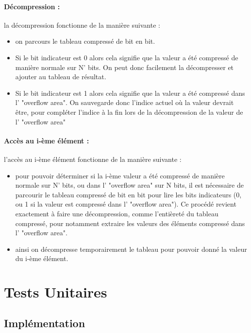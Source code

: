 \documentclass[titlepage]{article}
\begin{document}
\paragraph{Décompression :} la décompression fonctionne de la manière suivante :
\begin{itemize}
\item on parcours le tableau compressé de bit en bit.
\item Si le bit indicateur est 0 alors cela signifie que la valeur a été compressé de manière normale sur N' bits. On peut donc facilement la décompresser et ajouter au tableau de résultat.
\item Si le bit indicateur est 1 alors cela signifie que la valeur a été compressé dans l' "overflow area". On sauvegarde donc l'indice actuel où la valeur devrait être, pour compléter l'indice à la fin lors de la décompression de la valeur de l' "overflow area"
\end{itemize}

\paragraph{Accès au i-ème élément :} l'accès au i-ème élément fonctionne de la manière suivante :
\begin{itemize}
\item pour pouvoir déterminer si la i-ème valeur a été compressé de manière normale sur N' bits, ou dans l' "overflow area" sur N bits, il est nécessaire de parcourir le tableau compressé de bit en bit pour lire les bits indicateurs (0, ou 1 si la valeur est compressé dans l' "overflow area"). Ce procédé revient exactement à faire une décompression, comme l'entièreté du tableau compressé, pour notamment extraire les valeurs des éléments compressé dans l' "overflow area".
\item ainsi on décompresse temporairement le tableau pour pouvoir donné la valeur du i-ème élément.
\end{itemize}


\clearpage




\section{Tests Unitaires}

\subsection{Implémentation}
\end{document}
